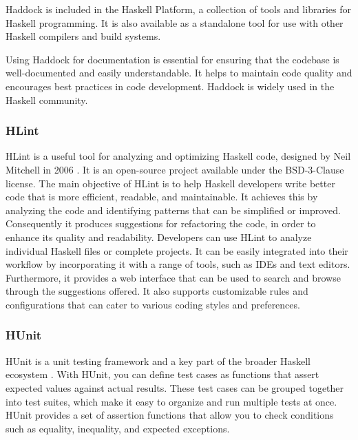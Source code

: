 \documentclass[a4paper, titlepage, twoside]{article}
\begin{document}
Haddock is included in the Haskell Platform, a collection of tools and libraries for Haskell programming. It is also available as a standalone tool for use with other Haskell compilers and build systems.

Using Haddock for documentation is essential for ensuring that the codebase is well-documented and easily understandable. It helps to maintain code quality and encourages best practices in code development. Haddock is widely used in the Haskell community.

\subsubsection{HLint}
\label{sec:org2958cb3}

HLint is a useful tool for analyzing and optimizing Haskell code, designed by Neil Mitchell in 2006 \autocite{mitchellHLint2023}. It is an open-source project available under the BSD-3-Clause license. The main objective of HLint is to help Haskell developers write better code that is more efficient, readable, and maintainable. It achieves this by analyzing the code and identifying patterns that can be simplified or improved. Consequently it produces suggestions for refactoring the code, in order to enhance its quality and readability. Developers can use HLint to analyze individual Haskell files or complete projects. It can be easily integrated into their workflow by incorporating it with a range of tools, such as IDEs and text editors. Furthermore, it provides a web interface that can be used to search and browse through the suggestions offered. It also supports customizable rules and configurations that can cater to various coding styles and preferences.

\subsubsection{HUnit}
\label{sec:orge9a4b62}

HUnit is a unit testing framework and a key part of the broader Haskell ecosystem \autocite{HUnitUserGuide2023}. With HUnit, you can define test cases as functions that assert expected values against actual results. These test cases can be grouped together into test suites, which make it easy to organize and run multiple tests at once. HUnit provides a set of assertion functions that allow you to check conditions such as equality, inequality, and expected exceptions.
\end{document}
